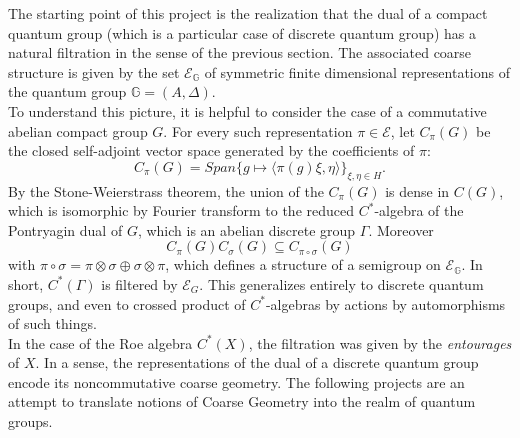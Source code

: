 The starting point of this project is the realization that the dual of a compact quantum group (which is a particular case of discrete quantum group) has a natural filtration in the sense of the previous section. The associated coarse structure is given by the set $\mathcal E_{\mathbb G}$ of symmetric finite dimensional representations of the quantum group $\mathbb G = (A,\Delta)$. \\

To understand this picture, it is helpful to consider the case of a commutative abelian compact group $G$. For every such representation $\pi\in \mathcal E$, let $C_\pi(G)$ be the closed self-adjoint vector space generated by the coefficients of $\pi$:
\[C_\pi(G)  = Span \{ g \mapsto \langle \pi(g)\xi, \eta\rangle\}_{\xi,\eta\in H}.\]
By the Stone-Weierstrass theorem, the union of the $C_\pi(G)$ is dense in $C(G)$, which is isomorphic by Fourier transform to the reduced $C^*$-algebra of the Pontryagin dual of $G$, which is an abelian discrete group $\Gamma$. Moreover
\[C_\pi(G)C_\sigma(G) \subseteq C_{\pi \circ\sigma}(G)\]
with $\pi \circ\sigma = \pi \otimes\sigma \oplus \sigma \otimes \pi$, which defines a structure of a semigroup on $\mathcal E_{\mathbb G}$. In short, $C^*(\Gamma)$ is filtered by 
$\mathcal E_G$. This generalizes entirely to discrete quantum groups, and even to crossed product of $C^*$-algebras by actions by automorphisms of such things. \\

In the case of the Roe algebra $C^*(X)$, the filtration was given by the \textit{entourages} of $X$. In a sense, the representations of the dual of a discrete quantum group encode its noncommutative coarse geometry. The following projects are an attempt to translate notions of Coarse Geometry into the realm of quantum groups. \\

